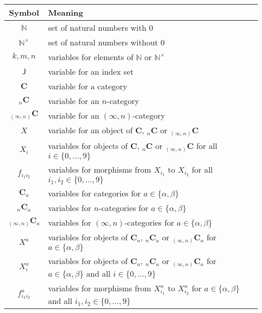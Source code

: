 \begin{longtable}{cl}
  \hline
  Symbol
  &
  Meaning
  \\
  \hline
  \endhead
  \hline
  \endfoot
  $\mathbb{N}$
  &
  set of natural numbers with $0$
  \\[6pt]
  $\mathbb{N}^{\times}$
  &
  set of natural numbers without $0$
  \\[6pt]
  $k,m,n$
  &
  variables for elements of $\mathbb{N}$ or $\mathbb{N}^{\times}$
  \\[6pt]
  $\mathsf{J}$
  &
  variable for an index set
  \\[6pt]
  $\mathbf{C}$
  &
  variable for a category
  \\[6pt]
  ${_{n}}\mathbf{C}$
  &
  variable for an $n$-category
  \\[6pt]
  ${_{(\infty,n)}}\mathbf{C}$
  &
  variable for an $(\infty,n)$-category
  \\[6pt]
  $X$
  &
  variable for an object of $\mathbf{C}$, ${_{n}}\mathbf{C}$
  or ${_{(\infty,n)}}\mathbf{C}$
  \\[6pt]
  $X_{i}$
  &
  variables for objects of $\mathbf{C}$, ${_{n}}\mathbf{C}$
  or ${_{(\infty,n)}}\mathbf{C}$
  for all $i \in \lbrace 0,\ldots,9 \rbrace$
  \\[6pt]
  $f_{i_{1}i_{2}}$
  &
  variables for morphisms from $X_{i_{1}}$ to $X_{i_{2}}$
  for all $i_{1},i_{2} \in \lbrace 0,\ldots,9 \rbrace$
  \\[6pt]
  $\mathbf{C}_{a}$
  &
  variables for categories
  for $a \in \lbrace \alpha,\beta \rbrace$
  \\[6pt]
  ${_{n}}\mathbf{C}_{a}$
  &
  variables for $n$-categories
  for $a \in \lbrace \alpha,\beta \rbrace$
  \\[6pt]
  ${_{(\infty,n)}}\mathbf{C}_{a}$
  &
  variables for $(\infty,n)$-categories
  for $a \in \lbrace \alpha,\beta \rbrace$
  \\[6pt]
  $X^{a}$
  &
  variables for objects of $\mathbf{C}_{a}$, ${_{n}}\mathbf{C}_{a}$
  or ${_{(\infty,n)}}\mathbf{C}_{a}$
  for $a \in \lbrace \alpha,\beta \rbrace$
  \\[6pt]
  $X_{i}^{a}$
  &
  variables for objects of $\mathbf{C}_{a}$, ${_{n}}\mathbf{C}_{a}$
  or ${_{(\infty,n)}}\mathbf{C}_{a}$
  for $a \in \lbrace \alpha,\beta \rbrace$
  and all $i \in \lbrace 0,\ldots,9 \rbrace$
  \\[6pt]
  $f_{i_{1}i_{2}}^{a}$
  &
  variables for morphisms from $X_{i_{1}}^{a}$ to $X_{i_{2}}^{a}$
  for $a \in \lbrace \alpha,\beta \rbrace$
  and all $i_{1},i_{2} \in \lbrace 0,\ldots,9 \rbrace$

\end{longtable}

